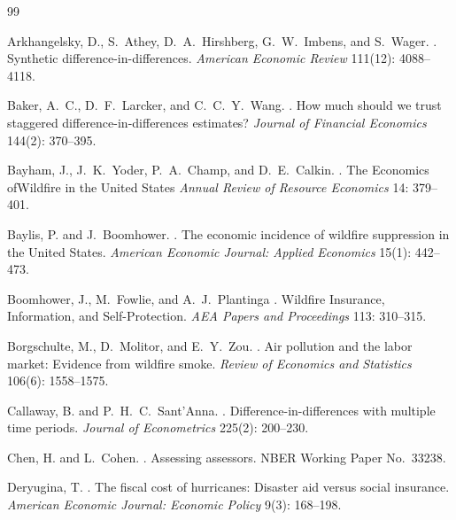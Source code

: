 \documentclass[12pt]{article}
\begin{document}

\begin{thebibliography}{99}

Arkhangelsky, D., S.~Athey, D.~A.~Hirshberg, G.~W.~Imbens, and S.~Wager.
.
\newblock Synthetic difference-in-differences.
\newblock \textit{American Economic Review} 111(12): 4088--4118.

Baker, A.~C., D.~F.~Larcker, and C.~C.~Y.~Wang.
.
\newblock How much should we trust staggered difference-in-differences estimates?
\newblock \textit{Journal of Financial Economics} 144(2): 370--395.

Bayham, J., J.~K.~Yoder, P.~A.~Champ, and D.~E.~Calkin.
.
\newblock The Economics ofWildfire in the United States
\newblock \textit{Annual Review of Resource Economics} 14: 379--401.

Baylis, P. and J.~Boomhower.
.
\newblock The economic incidence of wildfire suppression in the United States.
\newblock \textit{American Economic Journal: Applied Economics} 15(1): 442--473.

Boomhower, J., M.~Fowlie, and A.~J.~Plantinga
.
\newblock Wildfire Insurance, Information, and Self-Protection.
\newblock \textit{AEA Papers and Proceedings} 113: 310--315.


Borgschulte, M., D.~Molitor, and E.~Y.~Zou.
.
\newblock Air pollution and the labor market: Evidence from wildfire smoke.
\newblock \textit{Review of Economics and Statistics} 106(6): 1558--1575.

Callaway, B. and P.~H.~C.~Sant'Anna.
.
\newblock Difference-in-differences with multiple time periods.
\newblock \textit{Journal of Econometrics} 225(2): 200--230.

Chen, H. and L.~Cohen.
.
\newblock Assessing assessors.
\newblock NBER Working Paper No.~33238.

Deryugina, T.
.
\newblock The fiscal cost of hurricanes: Disaster aid versus social insurance.
\newblock \textit{American Economic Journal: Economic Policy} 9(3): 168--198.


\end{thebibliography}
\end{document}
